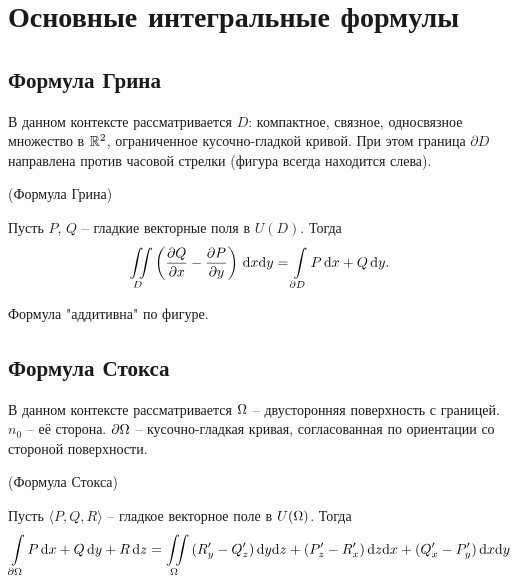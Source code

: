 \chapter{Основные интегральные формулы}
\section{Формула Грина}

\begin{remark}
     В данном контексте рассматривается $D$: компактное, связное,
     односвязное множество в $\mathbb{R}^2$, ограниченное кусочно-гладкой кривой.
     При этом граница $\partial D$ направлена против часовой стрелки 
     (фигура всегда находится слева).
\end{remark}

\begin{theorem}(Формула Грина)

    Пусть $P$, $Q$ -- гладкие векторные поля в $U(D)$. Тогда
\[
    \iint\limits_{D}{\left( \dfrac{\partial Q}{\partial x} - \dfrac{\partial P}{\partial y} \right) \,\mathrm{d} x \mathrm{d} y}
    = \int\limits_{\partial D}{P \,\mathrm{d} x + Q \,\mathrm{d} y}
.\] 
\end{theorem}

\begin{remark}
    Формула "аддитивна" по фигуре.
\end{remark}

\section{Формула Стокса}

\begin{remark}
    В данном контексте рассматривается $\Omega$ -- двусторонняя поверхность с границей.
    $n_0$ -- её сторона. $\partial \Omega$ -- кусочно-гладкая кривая, согласованная
    по ориентации со стороной поверхности.
\end{remark}

\begin{theorem}(Формула Стокса)

    Пусть $\langle P, Q, R \rangle$ -- гладкое векторное поле в $U(\Omega)$. Тогда
    \begin{align*}
        \int\limits_{\partial \Omega}{P \,\mathrm{d} x + Q \,\mathrm{d} y + R \,\mathrm{d} z} =
        \iint\limits_{\Omega}{(R'_y - Q'_z) \,\mathrm{d} y \mathrm{d} z + (P'_z - R'_x) \,\mathrm{d} z \mathrm{d} x + (Q'_x - P'_y) \,\mathrm{d} x \mathrm{d} y}
    \end{align*}
\end{theorem}

